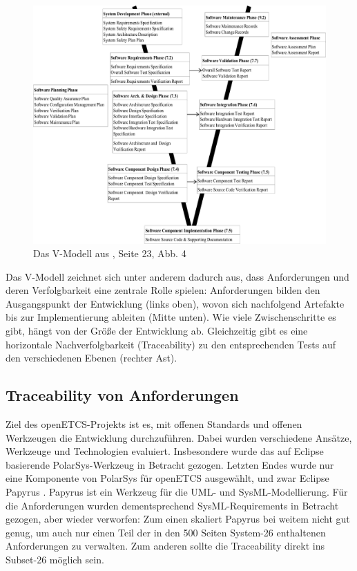 \documentclass[twoside]{article}
\begin{document}
\begin{multicols}{2}
\begin{figure}
\centering
\includegraphics[width=0.8\linewidth]{img/v-modell.png}
\caption{{Das V-Modell aus \cite{en50128}, Seite 23, Abb. 4}}
\label{fig:v-modell}
\end{figure}

Das V-Modell zeichnet sich unter anderem dadurch aus, dass Anforderungen und deren Verfolgbarkeit eine zentrale Rolle spielen: Anforderungen bilden den Ausgangspunkt der Entwicklung (\glqq{}links oben\grqq{}), wovon sich nachfolgend Artefakte bis zur Implementierung ableiten (\glqq{}Mitte unten\grqq{}). Wie viele Zwischenschritte es gibt, hängt von der Größe der Entwicklung ab.  Gleichzeitig gibt es eine \glqq{}horizontale\grqq{} Nachverfolgbarkeit (Traceability) zu den entsprechenden Tests auf den verschiedenen Ebenen (\glqq{}rechter Ast\grqq{}).

\subsection{Traceability von Anforderungen}
\label{sec:traceability}

Ziel des openETCS-Projekts ist es, mit offenen Standards und offenen Werkzeugen die Entwicklung durchzuführen.  Dabei wurden verschiedene Ansätze, Werkzeuge und Technologien evaluiert.  Insbesondere wurde das auf Eclipse basierende PolarSys-Werkzeug \cite{polarsys} in Betracht gezogen.  Letzten Endes wurde nur eine Komponente von PolarSys für openETCS ausgewählt, und zwar Eclipse Papyrus \cite{papyrus}.  Papyrus ist ein Werkzeug für die UML- und SysML-Modellierung.  Für die Anforderungen wurden dementsprechend SysML-Requirements in Betracht gezogen, aber wieder verworfen: Zum einen skaliert Papyrus bei weitem nicht gut genug, um auch nur einen Teil der in den 500 Seiten System-26 enthaltenen Anforderungen zu verwalten.  Zum anderen sollte die Traceability direkt ins Subset-26 möglich sein.


\end{multicols}
\end{document}
